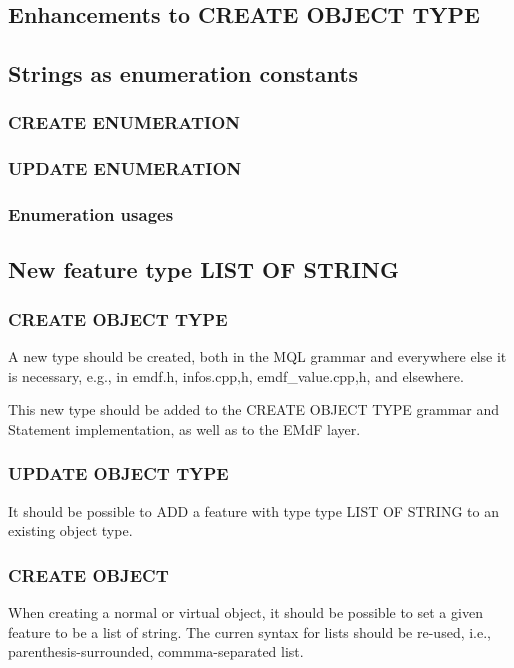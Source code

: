\documentclass[a4paper,12pt]{article}
\begin{document}
\subsection{Enhancements to CREATE OBJECT TYPE}

\subsection{Strings as enumeration constants}

\subsubsection{CREATE ENUMERATION}
\subsubsection{UPDATE ENUMERATION}
\subsubsection{Enumeration usages}

\subsection{New feature type LIST OF STRING}

\subsubsection{CREATE OBJECT TYPE}

A new type should be created, both in the MQL grammar and everywhere
else it is necessary, e.g., in emdf.h, infos.{cpp,h},
emdf\_value.{cpp,h}, and elsewhere.

This new type should be added to the CREATE OBJECT TYPE grammar and
Statement implementation, as well as to the EMdF layer.

\subsubsection{UPDATE OBJECT TYPE}

It should be possible to ADD a feature with type type LIST OF STRING
to an existing object type.

\subsubsection{CREATE OBJECT}

When creating a normal or virtual object, it should be possible to set
a given feature to be a list of string.  The curren syntax for lists
should be re-used, i.e., parenthesis-surrounded, commma-separated
list.
\end{document}

